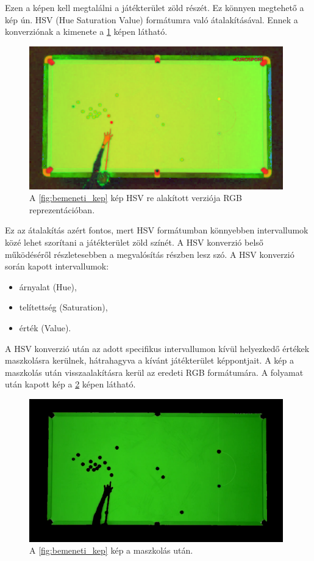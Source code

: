 \par Ezen a képen kell megtalálni a játékterület zöld részét. Ez könnyen megtehető a kép ún. HSV (Hue Saturation Value) formátumra való átalakításával. Ennek a konverziónak a kimenete a \ref{fig:bemeneti_kep_hsv} képen látható.

\begin{figure}[!ht]
    \centering
    \includegraphics[width=110mm, keepaspectratio]{figures/input_screen_hsv.png}
    \caption{A \ref{fig:bemeneti_kep} kép HSV re alakított verziója RGB reprezentációban.}
    \label{fig:bemeneti_kep_hsv}
\end{figure}

\par Ez az átalakítás azért fontos, mert HSV formátumban könnyebben intervallumok közé lehet szorítani a játékterület zöld színét. A HSV konverzió belső működéséről részletesebben a megvalósítás részben lesz szó.
\newline A HSV konverzió során kapott intervallumok:
\begin{itemize}
    \setlength\itemsep{-2pt}
    \item árnyalat (Hue),
    \item telítettség (Saturation),
    \item érték (Value).
\end{itemize}

\par A HSV konverzió után az adott specifikus intervallumon kívül helyezkedő értékek maszkolásra kerülnek, hátrahagyva a kívánt játékterület képpontjait. A kép a maszkolás után visszaalakításra kerül az eredeti RGB formátumára. A folyamat után kapott kép a \ref{fig:bemeneti_kep_mask} képen látható.

\begin{figure}[!ht]
    \centering
    \includegraphics[width=110mm, keepaspectratio]{figures/input_screen_mask.png}
    \caption{A \ref{fig:bemeneti_kep} kép a maszkolás után.}
    \label{fig:bemeneti_kep_mask}
\end{figure}

